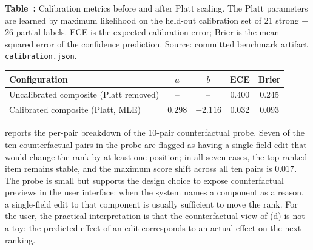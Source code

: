 \begin{center}
\label{tab:calibration}
\par\smallskip\noindent\textbf{Table~\thetable:} Calibration metrics before and after Platt scaling. The Platt parameters are learned by maximum likelihood on the held-out calibration set of 21 strong + 26 partial labels. ECE is the expected calibration error; Brier is the mean squared error of the confidence prediction. Source: committed benchmark artifact \texttt{calibration.json}.
\par\smallskip
\begin{tabular}{@{}lcccc@{}}
\toprule
Configuration & $a$ & $b$ & ECE & Brier \\
\midrule
Uncalibrated composite (Platt removed) & -- & -- & 0.400 & 0.245 \\
Calibrated composite (Platt, MLE) & 0.298 & $-2.116$ & 0.032 & 0.093 \\
\bottomrule
\end{tabular}
\par\vspace{0.4em}
\end{center}

 reports the per-pair breakdown of the 10-pair counterfactual probe.
Seven of the ten counterfactual pairs in the probe are flagged as having a single-field edit that would change the rank by at least one position; in all seven cases, the top-ranked item remains stable, and the maximum score shift across all ten pairs is $0.017$.
The probe is small but supports the design choice to expose counterfactual previews in the user interface: when the system names a component as a reason, a single-field edit to that component is usually sufficient to move the rank.
For the user, the practical interpretation is that the counterfactual view of (d) is not a toy: the predicted effect of an edit corresponds to an actual effect on the next ranking.

